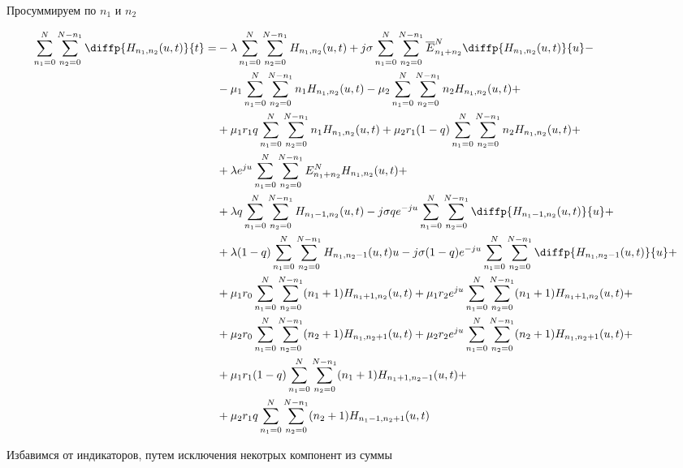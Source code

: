 Просуммируем по $n_{1}$ и $n_{2}$

\begin{equation*}
\begin{aligned}
	\sum_{n_1=0}^N \sum_{n_2=0}^{N-n_1}\diffp{H_{n_1,n_2}(u,t)}{t}=
	&-\lambda \sum_{n_1=0}^N\sum_{n_2=0}^{N-n_1}
	H_{n_1, n_2}(u,t)
	+j\sigma \sum_{n_1=0}^N\sum_{n_2=0}^{N-n_1}
	\overline{E}^N_{n_1+n_2}\diffp{H_{n_1, n_2}(u,t)}{u}-\\
	&-\mu_1 \sum_{n_1=0}^N\sum_{n_2=0}^{N-n_1}
	n_1 H_{n_1, n_2}(u,t)
	-\mu_2 \sum_{n_1=0}^N\sum_{n_2=0}^{N-n_1}
	n_2 H_{n_1, n_2}(u,t)+\\
	&+\mu_1 r_1 q \sum_{n_1=0}^N\sum_{n_2=0}^{N-n_1}
	n_1 H_{n_1, n_2}(u,t)
	+\mu_2 r_1 (1-q)\sum_{n_1=0}^N\sum_{n_2=0}^{N-n_1} 
	n_2 H_{n_1, n_2}(u,t)+\\
	&+\lambda e^{ju}\sum_{n_1=0}^N\sum_{n_2=0}^{N-n_1}
	E^N_{n_1+n_2}H_{n_1, n_2}(u,t)+\\
	&+\lambda q \sum_{n_1=0}^N\sum_{n_2=0}^{N-n_1}
	H_{n_1-1, n_2}(u,t)
	-j \sigma q e^{-ju}\sum_{n_1=0}^N\sum_{n_2=0}^{N-n_1}
	\diffp{H_{n_1-1, n_2}(u,t)}{u}+\\
	&+\lambda (1-q) \sum_{n_1=0}^N\sum_{n_2=0}^{N-n_1}
	H_{n_1, n_2-1}(u,t){u}
	-j \sigma (1-q) e^{-ju}\sum_{n_1=0}^N\sum_{n_2=0}^{N-n_1}
	\diffp{H_{n_1, n_2-1}(u,t)}{u}+\\
	&+\mu_1 r_0 \sum_{n_1=0}^N\sum_{n_2=0}^{N-n_1}
	(n_1+1) H_{n_1+1, n_2}(u,t)
	+\mu_1 r_2 e^{ju} \sum_{n_1=0}^N\sum_{n_2=0}^{N-n_1}
	(n_1+1) H_{n_1+1, n_2}(u,t)+\\
	&+\mu_2 r_0 \sum_{n_1=0}^N\sum_{n_2=0}^{N-n_1}
	(n_2+1) H_{n_1, n_2+1}(u,t)
	+\mu_2 r_2 e^{ju} \sum_{n_1=0}^N\sum_{n_2=0}^{N-n_1}
	(n_2+1) H_{n_1, n_2+1}(u,t)+\\
	&+\mu_1 r_1 (1-q) \sum_{n_1=0}^N\sum_{n_2=0}^{N-n_1}
	(n_1+1)H_{n_1+1, n_2-1}(u,t)+\\
	&+\mu_2 r_1 q \sum_{n_1=0}^N\sum_{n_2=0}^{N-n_1}
	(n_2+1)H_{n_1-1, n_2+1}(u,t)\\	
\end{aligned}
\end{equation*}

Избавимся от индикаторов, путем исключения некотрых компонент из суммы

